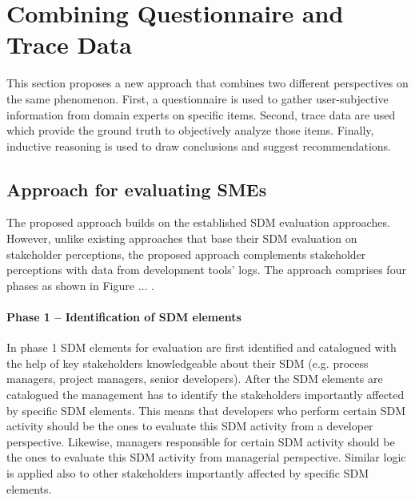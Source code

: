\section{Combining Questionnaire and Trace Data}
\label{sec:combining-questionnaier-and-trace}


This section proposes a new approach that combines two different perspectives on the same phenomenon. First, a questionnaire is used to gather user-subjective information from domain experts on specific items. Second, trace data are used which provide the ground truth to objectively analyze those items. Finally, inductive reasoning is used to draw conclusions and suggest recommendations.



\subsection{Approach for evaluating SMEs}

The proposed approach builds on the established SDM evaluation approaches. However, unlike existing approaches that base their SDM evaluation on stakeholder perceptions, the proposed approach complements stakeholder perceptions with data from development tools’ logs. The approach comprises four phases as shown in Figure $\ldots$ .  


\paragraph{Phase 1 – Identification of SDM elements }

In phase 1 SDM elements for evaluation are first identified and catalogued with the help of key stakeholders knowledgeable about their SDM (e.g. process managers, project managers, senior developers). After the SDM elements are catalogued the management has to identify the stakeholders importantly affected by specific SDM elements. This means that developers who perform certain SDM activity should be the ones to evaluate this SDM activity from a developer perspective. Likewise, managers responsible for certain SDM activity should be the ones to evaluate this SDM activity from managerial perspective. Similar logic is applied also to other stakeholders importantly affected by specific SDM elements. 

